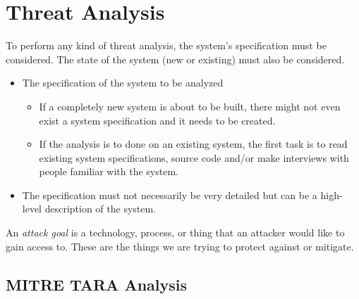 \section{Threat Analysis}\label{sec:Threat_Analysis}
To perform any kind of threat analysis, the system's specification must be considered.
The state of the system (new or existing) must also be considered.
\begin{itemize}[noitemsep]
\item The specification of the system to be analyzed
  \begin{itemize}[noitemsep]
  \item If a completely new system is about to be built, there might not even exist a system specification and it needs to be created.
  \item If the analysis is to done on an existing system, the first task is to read existing system specifications, source code and/or make interviews with people familiar with the system.
  \end{itemize}

\item The specification must not necessarily be very detailed but can be a high-level description of the system.
\end{itemize}

\begin{definition}\label{def:Attack_Goal}
  An \emph{attack goal} is a technology, process, or thing that an attacker would like to gain access to.
  These are the things we are trying to protect against or mitigate.
\end{definition}





\subsection{MITRE TARA Analysis}\label{subsec:TARA_Analysis}

